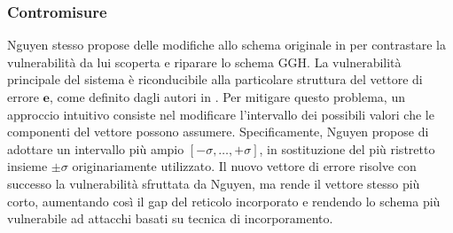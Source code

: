 \subsubsection{Contromisure}
Nguyen stesso propose delle modifiche allo schema originale in \cite[Sezione 7]{Nguyen99} 
per contrastare la vulnerabilità da lui scoperta e riparare lo schema GGH.
La vulnerabilità principale del sistema è riconducibile alla particolare struttura del
vettore di errore $\mathbf{e}$, come definito dagli autori in \cite{GGH97}. Per mitigare 
questo problema, un approccio intuitivo consiste nel modificare l'intervallo dei possibili 
valori che le componenti del vettore possono assumere. Specificamente, Nguyen propose di 
adottare un intervallo più ampio $[-\sigma, \dots, +\sigma]$, in sostituzione del più 
ristretto insieme ${\pm\sigma}$ originariamente utilizzato. Il nuovo vettore di errore risolve
con successo la vulnerabilità sfruttata da Nguyen, ma rende il vettore stesso più corto, 
aumentando così il gap del reticolo incorporato e rendendo lo schema più vulnerabile ad 
attacchi basati su tecnica di incorporamento. 

